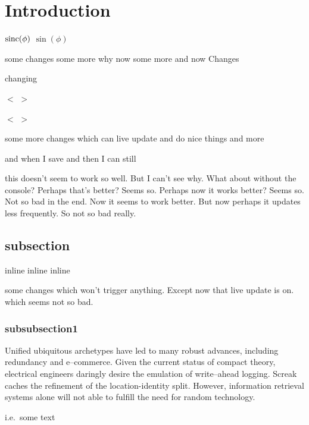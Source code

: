 
\section{Introduction}
\label{sec:intro}

${\rm sinc}(\phi)$ 
$\sin(\phi)$  

some changes some more why now some more and now
Changes

changing

$<$ $>$

$<$ $>$


some more changes which can live update and do nice things and more

and when I save and  then I can still  

this doesn't seem to work so well. But I can't see why. What about without the
console? Perhaps that's better? Seems so. Perhaps now it works better? Seems so.
Not so bad in the end. Now it seems to work better. But now perhaps it updates
less frequently. So not so bad really.


\subsection{subsection}
  
inline %
inline %
inline %

some changes which won't trigger anything. Except now that live update is on.
which seems not so bad.



\subsubsection*{subsubsection1}

Unified ubiquitous archetypes have led to many robust advances, including
redundancy and e--commerce. Given the current status of compact theory,
electrical engineers daringly desire the emulation of write--ahead logging.
Screak caches the refinement of the location-identity split. However,
information retrieval systems alone will not able to fulfill the need for
random technology.


i.e.\ some text


